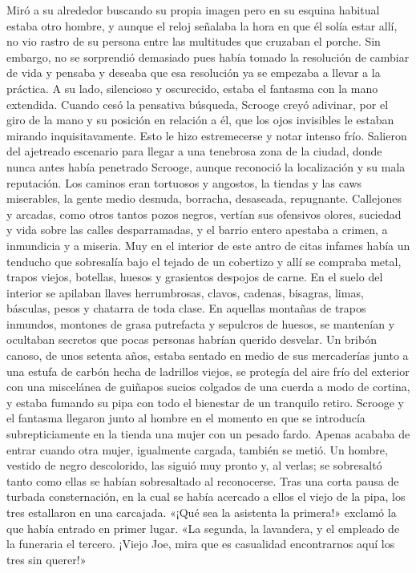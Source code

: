 \documentclass{novela}
\begin{document}
 Miró a su alrededor buscando su propia imagen pero en su esquina habitual estaba otro hombre, y aunque el reloj señalaba la hora en que él solía estar allí, no vio rastro de su persona entre las multitudes que cruzaban el porche. Sin embargo, no se sorprendió demasiado pues había tomado la resolución de cambiar de vida y pensaba y deseaba que esa resolución ya se empezaba a llevar a la práctica.
 A su lado, silencioso y oscurecido, estaba el fantasma con la mano extendida. Cuando cesó la pensativa búsqueda, Scrooge creyó adivinar, por el giro de la mano y su posición en relación a él, que los ojos invisibles le estaban mirando inquisitavamente. Esto le hizo estremecerse y notar intenso frío.
 Salieron del ajetreado escenario para llegar a una tenebrosa zona de la ciudad, donde nunca antes había penetrado Scrooge, aunque reconoció la localización y su mala reputación. Los caminos eran tortuosos y angostos, la tiendas y las caws miserables, la gente medio desnuda, borracha, desaseada, repugnante. Callejones y arcadas, como otros tantos pozos negros, vertían sus ofensivos olores, suciedad y vida sobre las calles desparramadas, y el barrio entero apestaba a crimen, a inmundicia y a miseria.
 Muy en el interior de este antro de citas infames había un tenducho que sobresalía bajo el tejado de un cobertizo y allí se compraba metal, trapos viejos, botellas, huesos y grasientos despojos de carne. En el suelo del interior se apilaban llaves herrumbrosas, clavos, cadenas, bisagras, limas, básculas, pesos y chatarra de toda clase. En aquellas montañas de trapos inmundos, montones de grasa putrefacta y sepulcros de huesos, se mantenían y ocultaban secretos que pocas personas habrían querido desvelar. Un bribón canoso, de unos setenta años, estaba sentado en medio de sus mercaderías junto a una estufa de carbón hecha de ladrillos viejos, se protegía del aire frío del exterior con una miscelánea de guiñapos sucios colgados de una cuerda a modo de cortina, y estaba fumando su pipa con todo el bienestar de un tranquilo retiro.
 Scrooge y el fantasma llegaron junto al hombre en el momento en que se introducía subrepticiamente en la tienda una mujer con un pesado fardo. Apenas acababa de entrar cuando otra mujer, igualmente cargada, también se metió. Un hombre, vestido de negro descolorido, las siguió muy pronto y, al verlas; se sobresaltó tanto como ellas se habían sobresaltado al reconocerse. Tras una corta pausa de turbada consternación, en la cual se había acercado a ellos el viejo de la pipa, los tres estallaron en una carcajada.
 «¡Qué sea la asistenta la primera!» exclamó la que había entrado en primer lugar. «La segunda, la lavandera, y el empleado de la funeraria el tercero. ¡Viejo Joe, mira que es casualidad encontrarnos aquí los tres sin querer!»
\end{document}
